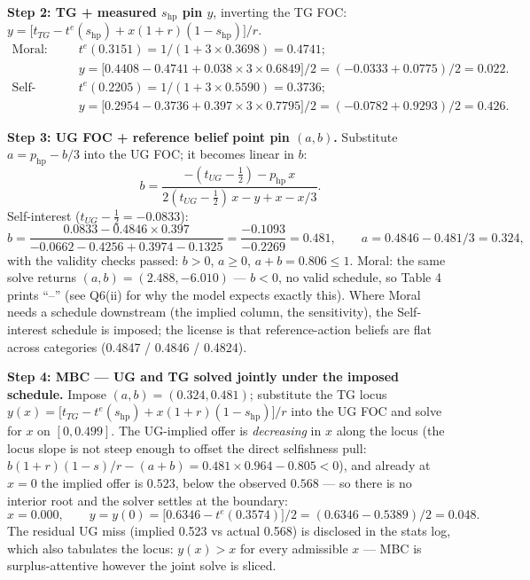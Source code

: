 \documentclass[11pt]{article}
\begin{document}
\textbf{Step 2: TG + measured $s_{\mathrm{hp}}$ pin $y$}, inverting the TG FOC: $y = \bigl[t_{TG} - t^{e}(s_{\mathrm{hp}}) + x(1+r)(1-s_{\mathrm{hp}})\bigr]/r$.
\begin{align*}
\text{Moral:} \quad & t^{e}(0.3151) = 1/(1+3 \times 0.3698) = 0.4741; \\
& y = \bigl[0.4408 - 0.4741 + 0.038 \times 3 \times 0.6849\bigr]/2 = (-0.0333 + 0.0775)/2 = 0.022. \\
\text{Self-interest:} \quad & t^{e}(0.2205) = 1/(1+3 \times 0.5590) = 0.3736; \\
& y = \bigl[0.2954 - 0.3736 + 0.397 \times 3 \times 0.7795\bigr]/2 = (-0.0782 + 0.9293)/2 = 0.426.
\end{align*}

\textbf{Step 3: UG FOC + reference belief point pin $(a,b)$.} Substitute $a = p_{\mathrm{hp}} - b/3$ into the UG FOC; it becomes linear in $b$:
\[
b = \frac{-(t_{UG} - \tfrac12) - p_{\mathrm{hp}}\,x}{2(t_{UG} - \tfrac12)\,x - y + x - x/3}.
\]
Self-interest ($t_{UG} - \tfrac12 = -0.0833$):
\[
b = \frac{0.0833 - 0.4846 \times 0.397}{-0.0662 - 0.4256 + 0.3974 - 0.1325} = \frac{-0.1093}{-0.2269} = 0.481, \qquad a = 0.4846 - 0.481/3 = 0.324,
\]
with the validity checks passed: $b > 0$, $a \ge 0$, $a + b = 0.806 \le 1$. Moral: the same solve returns $(a,b) = (2.488, -6.010)$ --- $b < 0$, no valid schedule, so Table 4 prints ``--'' (see Q6(ii) for why the model expects exactly this). Where Moral needs a schedule downstream (the implied column, the sensitivity), the Self-interest schedule is imposed; the license is that reference-action beliefs are flat across categories (0.4847 / 0.4846 / 0.4824).

\textbf{Step 4: MBC --- UG and TG solved jointly under the imposed schedule.} Impose $(a,b) = (0.324, 0.481)$; substitute the TG locus $y(x) = \bigl[t_{TG} - t^{e}(s_{\mathrm{hp}}) + x(1+r)(1-s_{\mathrm{hp}})\bigr]/r$ into the UG FOC and solve for $x$ on $[0, 0.499]$. The UG-implied offer is \emph{decreasing} in $x$ along the locus (the locus slope is not steep enough to offset the direct selfishness pull: $b(1+r)(1-s)/r - (a+b) = 0.481 \times 0.964 - 0.805 < 0$), and already at $x = 0$ the implied offer is $0.523$, below the observed $0.568$ --- so there is no interior root and the solver settles at the boundary:
\[
x = 0.000, \qquad y = y(0) = \bigl[0.6346 - t^{e}(0.3574)\bigr]/2 = (0.6346 - 0.5389)/2 = 0.048.
\]
The residual UG miss (implied 0.523 vs actual 0.568) is disclosed in the stats log, which also tabulates the locus: $y(x) > x$ for every admissible $x$ --- MBC is surplus-attentive however the joint solve is sliced.
\end{document}
